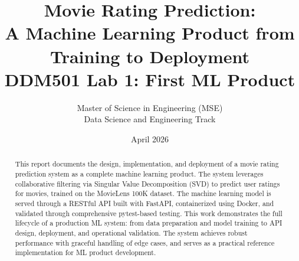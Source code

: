 \documentclass[12pt,a4paper]{article}
\title{%
  \Large\textbf{Movie Rating Prediction:}\\
  \large A Machine Learning Product from Training to Deployment\\
  \large DDM501 Lab 1: First ML Product
}
\author{%
  Master of Science in Engineering (MSE)\\
  \vspace{0.3cm}
  Data Science and Engineering Track
}
\date{April 2026}
\begin{document}
\maketitle

\begin{abstract}
  This report documents the design, implementation, and deployment of a movie rating prediction 
  system as a complete machine learning product. The system leverages collaborative filtering 
  via Singular Value Decomposition (SVD) to predict user ratings for movies, trained on the 
  MovieLens 100K dataset. The machine learning model is served through a RESTful API built 
  with FastAPI, containerized using Docker, and validated through comprehensive pytest-based 
  testing. This work demonstrates the full lifecycle of a production ML system: from data 
  preparation and model training to API design, deployment, and operational validation. The system 
  achieves robust performance with graceful handling of edge cases, and serves as a practical 
  reference implementation for ML product development.
\end{abstract}

\newpage
\tableofcontents

\newpage














\newpage


\end{document}
